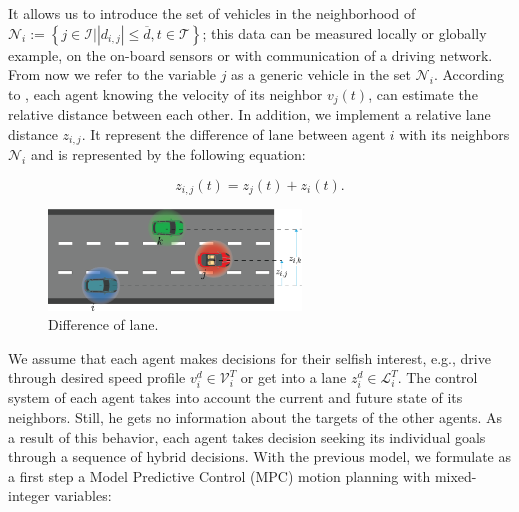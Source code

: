 It allows us to introduce the set of vehicles in the neighborhood of  $\mathcal{N}_i := \left\{ j \in \mathcal{I}  | \left| d_{i,j} \right| \le \overline{d} , t \in \mathcal{T}\right\}$; this data can be measured locally or globally example, on the on-board sensors or with communication of a driving network. From now we refer to the variable $j$ as a generic vehicle in the set $\mathcal{N}_i$. According to \label{eq:distance}, each agent knowing the velocity of its neighbor $v_j(t)$, can estimate the relative distance between each other.
In addition, we implement a relative lane distance $z_{i,j}$. It represent the difference of lane between agent $i$ with its neighbors $\mathcal{N}_i$ and is represented by the following equation:

\begin{equation}
z_{i,j}(t)= z_{j}(t) + z_{i}(t).
\label{eq:lanes}
\end{equation}

\begin{figure}[H]
    \centering
    \includegraphics[width=0.6\textwidth]{Kap3/Asset 5.png}
    \caption{Difference of lane.}
    \label{fig:lanes}
\end{figure}

We assume that each agent makes decisions for their selfish interest, e.g., drive through desired speed profile $v_i^d \in \mathcal{V}^T_i$ or get into a lane $z_i^d \in \mathcal{L}^T_i $. The control system of each agent takes into account the current and future state of its neighbors. Still, he gets no information about the targets of the other agents. As a result of this behavior, each agent takes decision seeking its individual goals through a sequence of hybrid decisions.
With the previous model, we formulate as a first step a Model Predictive Control (MPC) motion planning with mixed-integer variables:

